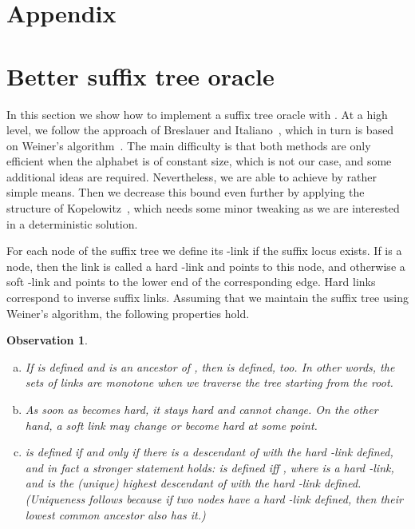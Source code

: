 \documentclass[11pt,onecolumn,final]{article} \usepackage{a4}
\theoremstyle{plain}
\newtheorem{observation}[definition]{Observation}
\theoremstyle{remark}
\begin{document}
\section*{Appendix}
\appendix
\section{Better suffix tree oracle}

In this section we show how to implement a suffix tree oracle with . At a high level, we follow the approach of Breslauer and Italiano~\cite{Breslauer11fringe}, which in turn is based on Weiner's algorithm~\cite{weiner73linear}. The main difficulty is that both methods are only efficient when the alphabet is of constant size, which is not our case, and some additional ideas are required. Nevertheless, we are able to achieve  by rather simple means. Then we decrease this bound even further by applying the structure of Kopelowitz~\cite{Kopelot12indexing}, which needs some minor tweaking as we are interested in a deterministic solution.

For each node  of the suffix tree we define its -link  if the suffix locus  exists. If  is a node, then the link is called a hard -link and points to this node, and otherwise a soft -link and points to the lower end of the corresponding edge. Hard links correspond to inverse suffix links. Assuming that we maintain the suffix tree using Weiner's algorithm, the following properties hold.

\begin{observation}
\begin{enumerate}[(a)]
\item\label{obs:monotone} If  is defined and  is an ancestor of , then  is defined, too. In other words, the sets of links are monotone when we traverse the tree starting from the root.
\item\label{obs:change} As soon as  becomes hard, it stays hard and cannot change. On the other hand, a soft link may change or become hard at some point.
\item\label{obs:reconstruct}  is defined if and only if there is a descendant  of  with the hard -link defined, and in fact a stronger statement holds:  is defined iff , where  is a hard -link, and  is the (unique) highest descendant of  with the hard -link defined. (Uniqueness follows because if two nodes have a hard -link defined, then their lowest common ancestor also has it.)
\end{enumerate}
\end{observation}
\end{document}

